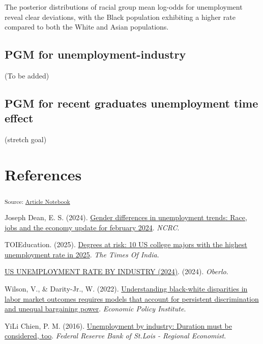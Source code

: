 \documentclass[
]{agujournal2019}
\newlength{\cslhangindent}
\newenvironment{CSLReferences}[2] %
 {\begin{list}{}{%
  \setlength{\itemindent}{0pt}
  \setlength{\leftmargin}{0pt}
  \setlength{\parsep}{0pt}
  \ifodd #1
   \setlength{\leftmargin}{\cslhangindent}
   \setlength{\itemindent}{-1\cslhangindent}
  \fi
  \setlength{\itemsep}{#2\baselineskip}}}
 {\end{list}}
\begin{document}
The posterior distributions of racial group mean log-odds for
unemployment reveal clear deviations, with the Black population
exhibiting a higher rate compared to both the White and Asian
populations.

\subsection{PGM for
unemployment-industry}\label{pgm-for-unemployment-industry}

(To be added)

\subsection{PGM for recent graduates unemployment time
effect}\label{pgm-for-recent-graduates-unemployment-time-effect}

(stretch goal)

\section*{References}\label{references}

\vspace{1em}

\textsubscript{Source:
\href{https://mw1296.github.io/dsan5650_social_causal_inference/index.qmd.html}{Article
Notebook}}

\label{refs}
\begin{CSLReferences}{1}{0}
Joseph Dean, E. S. (2024). \href{}{Gender differences in unemployment
trends: Race, jobs and the economy update for february 2024}.
\emph{NCRC}.

TOIEducation. (2025). \href{}{Degrees at risk: 10 US college majors with
the highest unemployment rate in 2025}. \emph{The Times Of India}.

\href{}{US UNEMPLOYMENT RATE BY INDUSTRY (2024)}. (2024). \emph{Oberlo}.

Wilson, V., \& Darity-Jr., W. (2022). \href{}{Understanding black-white
disparities in labor market outcomes requires models that account for
persistent discrimination and unequal bargaining power}. \emph{Economic
Policy Institute}.

YiLi Chien, P. M. (2016). \href{}{Unemployment by industry: Duration
must be considered, too}. \emph{Federal Reserve Bank of St.Lois -
Regional Economist}.

\end{CSLReferences}
\end{document}
